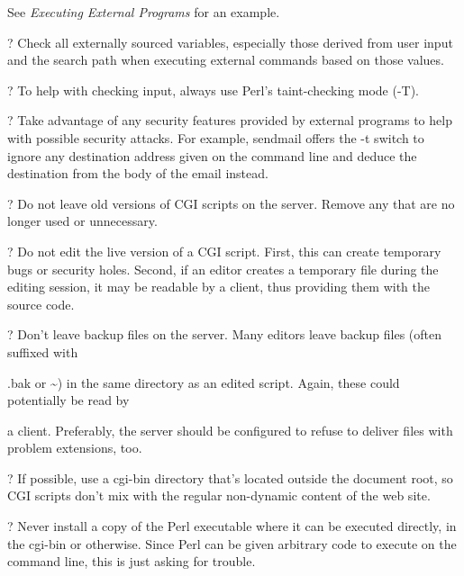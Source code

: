 \documentclass[a4paper,11pt]{book}
\begin{document}
\noindent See \textit{Executing External Programs }for an example.

\noindent 

\noindent ? Check all externally sourced variables, especially those derived from user input and the search path when executing external commands based on those values.

\noindent 

\noindent ? To help with checking input, always use Perl's taint-checking mode (-T).

\noindent 

\noindent ? Take advantage of any security features provided by external programs to help with possible security attacks. For example, sendmail offers the -t switch to ignore any destination address given on the command line and deduce the destination from the body of the email instead.

\noindent 

\noindent ? Do not leave old versions of CGI scripts on the server. Remove any that are no longer used or unnecessary.

\noindent 

\noindent ? Do not edit the live version of a CGI script. First, this can create temporary bugs or security holes. Second, if an editor creates a temporary file during the editing session, it may be readable by a client, thus providing them with the source code.

\noindent 

\noindent ? Don't leave backup files on the server. Many editors leave backup files (often suffixed with

\noindent .bak or \~{}) in the same directory as an edited script. Again, these could potentially be read by

\noindent a client. Preferably, the server should be configured to refuse to deliver files with problem extensions, too.

\noindent 

\noindent ? If possible, use a cgi-bin directory that's located outside the document root, so CGI scripts don't mix with the regular non-dynamic content of the web site.

\noindent 

\noindent ? Never install a copy of the Perl executable where it can be executed directly, in the cgi-bin or otherwise. Since Perl can be given arbitrary code to execute on the command line, this is just asking for trouble.

\noindent 
\end{document}
